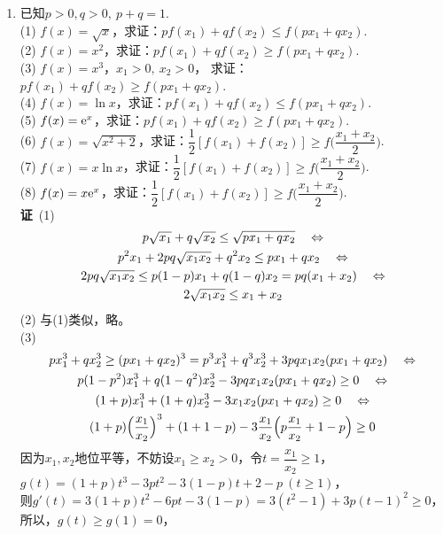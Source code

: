 \begin{enumerate}[label={\textbf{\arabic*.}},leftmargin=
    \inteval{\myenumleftmargin}pt]
\item 已知$ p>0,q>0,\ p+q=1$. \\
(1) $f(x)=\sqrt{x} $，求证：$ pf(x_1)+qf(x_2)\leq f(px_1+qx_2) $. \\
(2) $f(x)=x^2 $，求证：$ pf(x_1)+qf(x_2)\geq f(px_1+qx_2) $. \\
(3) $f(x)=x^3 $，$ x_1>0,\ x_2>0 $，
求证：$ pf(x_1)+qf(x_2)\geq f(px_1+qx_2) $. \\
(4) $f(x)=\ln x $，求证：$ pf(x_1)+qf(x_2)\leq f(px_1+qx_2) $. \\
(5) $f(x)=\mathrm{e}^x $，求证：$ pf(x_1)+qf(x_2)\geq f(px_1+qx_2) $. \\
(6) $f(x)=\sqrt{x^2+2} $，求证：$ \dfrac{1}{2}[f(x_1)+f(x_2)]\geq 
f\Big(\dfrac{x_1+x_2}{2}\Big) $. \\
(7) $f(x)=x\ln x $，求证：$ \dfrac{1}{2}[f(x_1)+f(x_2)]\geq 
f\Big(\dfrac{x_1+x_2}{2}\Big) $. \\
(8) $f(x)=x\mathrm{e}^x $，求证：$ \dfrac{1}{2}[f(x_1)+f(x_2)]\geq 
f\Big(\dfrac{x_1+x_2}{2}\Big) $. \\
\textbf{证}\ (1)
\begin{gather*}
    p\sqrt{x_1}+q\sqrt{x_2}\leq \sqrt{px_1+qx_2}\quad \Leftrightarrow \\
    p^2x_1+2pq\sqrt{x_1x_2}+q^2x_2\leq px_1+qx_2\quad \Leftrightarrow \\
    2pq\sqrt{x_1x_2}\leq p(1-p)x_1+q(1-q)x_2=pq(x_1+x_2)\quad \Leftrightarrow \\
    2\sqrt{x_1x_2}\leq x_1+x_2    
\end{gather*}
(2) 与(1)类似，略。\\
(3) 
\begin{gather}
    px_1^3+qx_2^3\geq (px_1+qx_2)^3=p^3x_1^3+q^3x_2^3+3pqx_1x_2(px_1+qx_2)
    \quad \Leftrightarrow \nonumber\\ 
    p(1-p^2)x_1^3+q(1-q^2)x_2^3-3pqx_1x_2(px_1+qx_2)\geq 0
    \quad \Leftrightarrow \nonumber \\
    (1+p)x_1^3+(1+q)x_2^3-3x_1x_2(px_1+qx_2)\geq 0
    \quad \Leftrightarrow \nonumber \\
    (1+p)\Big(\dfrac{x_1}{x_2}\Big)^3+(1+1-p)-3\dfrac{x_1}{x_2}
    \Big(p\dfrac{x_1}{x_2}+1-p\Big)\geq 0 \label{三次函数凹凸性-求导证明}
\end{gather}
因为$ x_1,x_2 $地位平等，不妨设$ x_1\geq x_2>0 $，令$ t=\dfrac{x_1}{x_2}\geq 1 $，\\
$ g(t)=(1+p)t^3-3pt^2-3(1-p)t+2-p\ (t\geq 1) $，\\ 则$ g'(t)=3(1+p)t^2-6pt-3(1-p)=
3(t^2-1)+3p(t-1)^2\geq 0 $，所以，$ g(t)\geq g(1)=0 $，

\end{enumerate}
